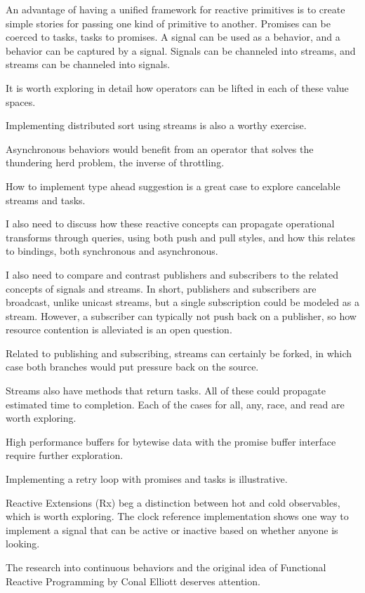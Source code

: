 An advantage of having a unified framework for reactive primitives is to create simple stories for passing one kind of primitive to another. Promises can be coerced to tasks, tasks to promises. A signal can be used as a behavior, and a behavior can be captured by a signal. Signals can be channeled into streams, and streams can be channeled into signals.

It is worth exploring in detail how operators can be lifted in each of these value spaces.

Implementing distributed sort using streams is also a worthy exercise.

Asynchronous behaviors would benefit from an operator that solves the thundering herd problem, the inverse of throttling.

How to implement type ahead suggestion is a great case to explore cancelable streams and tasks.

I also need to discuss how these reactive concepts can propagate operational transforms through queries, using both push and pull styles, and how this relates to bindings, both synchronous and asynchronous.

I also need to compare and contrast publishers and subscribers to the related concepts of signals and streams. In short, publishers and subscribers are broadcast, unlike unicast streams, but a single subscription could be modeled as a stream. However, a subscriber can typically not push back on a publisher, so how resource contention is alleviated is an open question.

Related to publishing and subscribing, streams can certainly be forked, in which case both branches would put pressure back on the source.

Streams also have methods that return tasks. All of these could propagate estimated time to completion. Each of the cases for all, any, race, and read are worth exploring.

High performance buffers for bytewise data with the promise buffer interface require further exploration.

Implementing a retry loop with promises and tasks is illustrative.

Reactive Extensions (Rx) beg a distinction between hot and cold observables, which is worth exploring. The clock reference implementation shows one way to implement a signal that can be active or inactive based on whether anyone is looking.

The research into continuous behaviors and the original idea of Functional Reactive Programming by Conal Elliott deserves attention.

